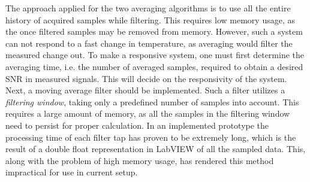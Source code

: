 \documentclass{standalone}
\begin{document}
The approach applied for the two averaging algorithms is to use all the entire history of acquired samples while filtering. This requires low memory usage, as the once filtered samples may be removed from memory. However, such a system can not respond to a fast change in temperature, as averaging would filter the measured change out. To make a responsive system, one must first determine the averaging time, i.e. the number of averaged samples, required to obtain a desired SNR in measured signals. This will decide on the responsivity of the system. Next, a moving average filter should be implemented. Such a filter utilizes a \textit{filtering window}, taking only a predefined number of samples into account. This requires a large amount of memory, as all the samples in the filtering window need to persist for proper calculation. In an implemented prototype the processing time of each filter tap has proven to be extremely long, which is the result of a double float representation in LabVIEW of all the sampled data. This, along with the problem of high memory usage, has rendered this method impractical for use in current setup. \\
\end{document}
